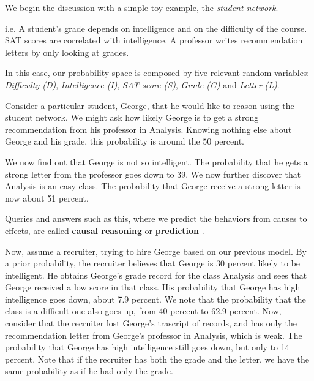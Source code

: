 We begin the discussion with a simple toy example, the \textit{student network}.
\begin{example}
    i.e. A student's grade depends on intelligence and on the difficulty of the course.
    SAT scores are correlated with intelligence. A professor writes recommendation letters by only looking at grades. \vspace{3.5pt}

    In this case, our probability space is composed by five relevant random variables: \textit{Difficulty (D)}, \textit{Intelligence (I)}, \textit{SAT score (S)}, \textit{Grade (G)} and \textit{Letter (L)}.
    \begin{center}
    \end{center}
    Consider a particular student, George, that he would like to reason using the student network. We might ask how likely George is to get a strong recommendation from his professor in Analysis.
    Knowing nothing else about George and his grade, this probability is around the $50$ percent. \vspace{3.5pt}

    We now find out that George is not so intelligent. The probability that he gets a strong letter from the professor goes down to 39. We now further discover that Analysis is an easy class.
    The probability that George receive a strong letter is now about 51 percent. \vspace{3.5pt}

    Queries and answers such as this, where we predict the behaviors from causes to effects, are called \textbf{causal reasoning} or \textbf{prediction} . \vspace{3.5pt}

    Now, assume a recruiter, trying to hire George based on our previous model. By a prior probability, the recruiter believes that George is 30 percent likely to be intelligent. 
    He obtains George's grade record for the class Analysis and sees that George received a low score in that class. His probability that George has high intelligence goes down,
    about 7.9 percent. We note that the probability that the class is a difficult one also goes up, from 40 percent to 62.9 percent. Now, consider that the recruiter lost George's trascript of records, and has only the recommendation letter from George's professor in Analysis, which is weak.
    The probability that George has high intelligence still goes down, but only to 14 percent. Note that if the recruiter has both the grade and the letter, we have the same probability
    as if he had only the grade. \vspace{3.5pt}


\end{example}
